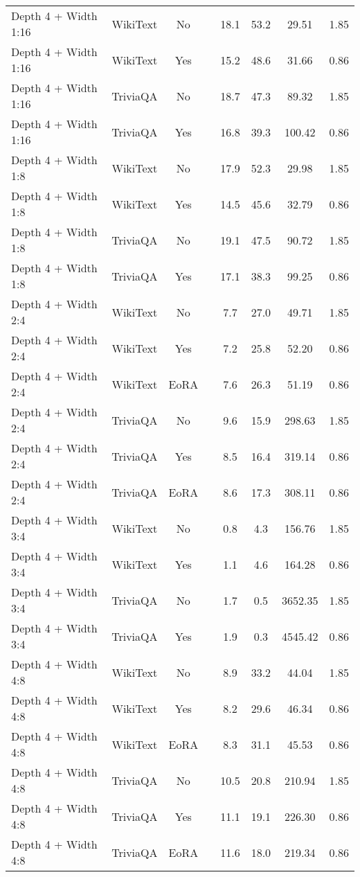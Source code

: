 \begin{longtable}{lcclcccc}
Depth 4 + Width 1:16 & WikiText & No & & 18.1 & 53.2 & 29.51 & 1.85 \\
Depth 4 + Width 1:16 & WikiText & Yes & & 15.2 & 48.6 & 31.66 & 0.86 \\
Depth 4 + Width 1:16 & TriviaQA & No & & 18.7 & 47.3 & 89.32 & 1.85 \\
Depth 4 + Width 1:16 & TriviaQA & Yes & & 16.8 & 39.3 & 100.42 & 0.86 \\
Depth 4 + Width 1:8 & WikiText & No & & 17.9 & 52.3 & 29.98 & 1.85 \\
Depth 4 + Width 1:8 & WikiText & Yes & & 14.5 & 45.6 & 32.79 & 0.86 \\
Depth 4 + Width 1:8 & TriviaQA & No & & 19.1 & 47.5 & 90.72 & 1.85 \\
Depth 4 + Width 1:8 & TriviaQA & Yes & & 17.1 & 38.3 & 99.25 & 0.86 \\
Depth 4 + Width 2:4 & WikiText & No & & 7.7 & 27.0 & 49.71 & 1.85 \\
Depth 4 + Width 2:4 & WikiText & Yes & & 7.2 & 25.8 & 52.20 & 0.86 \\
Depth 4 + Width 2:4 & WikiText & EoRA & & 7.6 & 26.3 & 51.19 & 0.86 \\
Depth 4 + Width 2:4 & TriviaQA & No & & 9.6 & 15.9 & 298.63 & 1.85 \\
Depth 4 + Width 2:4 & TriviaQA & Yes & & 8.5 & 16.4 & 319.14 & 0.86 \\
Depth 4 + Width 2:4 & TriviaQA & EoRA & & 8.6 & 17.3 & 308.11 & 0.86 \\
Depth 4 + Width 3:4 & WikiText & No & & 0.8 & 4.3 & 156.76 & 1.85 \\
Depth 4 + Width 3:4 & WikiText & Yes & & 1.1 & 4.6 & 164.28 & 0.86 \\
Depth 4 + Width 3:4 & TriviaQA & No & & 1.7 & 0.5 & 3652.35 & 1.85 \\
Depth 4 + Width 3:4 & TriviaQA & Yes & & 1.9 & 0.3 & 4545.42 & 0.86 \\
Depth 4 + Width 4:8 & WikiText & No & & 8.9 & 33.2 & 44.04 & 1.85 \\
Depth 4 + Width 4:8 & WikiText & Yes & & 8.2 & 29.6 & 46.34 & 0.86 \\
Depth 4 + Width 4:8 & WikiText & EoRA & & 8.3 & 31.1 & 45.53 & 0.86 \\
Depth 4 + Width 4:8 & TriviaQA & No & & 10.5 & 20.8 & 210.94 & 1.85 \\
Depth 4 + Width 4:8 & TriviaQA & Yes & & 11.1 & 19.1 & 226.30 & 0.86 \\
Depth 4 + Width 4:8 & TriviaQA & EoRA & & 11.6 & 18.0 & 219.34 & 0.86 \\

\end{longtable}

